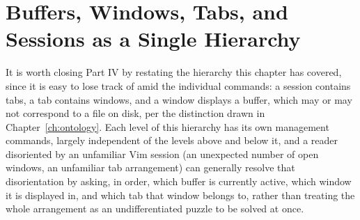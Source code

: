 \section{Buffers, Windows, Tabs, and Sessions as a Single Hierarchy}

It is worth closing Part IV by restating the hierarchy this chapter has covered, since it is easy to lose track of amid the individual commands: a session contains tabs, a tab contains windows, and a window displays a buffer, which may or may not correspond to a file on disk, per the distinction drawn in Chapter~\ref{ch:ontology}. Each level of this hierarchy has its own management commands, largely independent of the levels above and below it, and a reader disoriented by an unfamiliar Vim session (an unexpected number of open windows, an unfamiliar tab arrangement) can generally resolve that disorientation by asking, in order, which buffer is currently active, which window it is displayed in, and which tab that window belongs to, rather than treating the whole arrangement as an undifferentiated puzzle to be solved at once.
